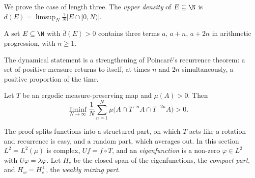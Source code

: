 We prove the case of length three. The \emph{upper density} of $E\subseteq\N$ is $\bar d(E)=\limsup_N\frac1N|E\cap[0,N)|$.

\begin{theorem}[Roth, 1953]\label{thm:roth}
A set $E\subseteq\N$ with $\bar d(E)>0$ contains three terms $a$, $a+n$, $a+2n$ in arithmetic progression, with $n\ge1$.
\end{theorem}

The dynamical statement is a strengthening of Poincar\'e's recurrence theorem: a set of positive measure returns to itself, at times $n$ and $2n$ simultaneously, a positive proportion of the time.

\begin{theorem}\label{thm:double}
Let $T$ be an ergodic measure-preserving map and $\mu(A)>0$. Then
\[
\liminf_{N\to\infty}\frac1N\sum_{n=1}^N\mu\bigl(A\cap T^{-n}A\cap T^{-2n}A\bigr)>0.
\]
\end{theorem}

The proof splits functions into a structured part, on which $T$ acts like a rotation and recurrence is easy, and a random part, which averages out. In this section $L^2=L^2(\mu)$ is complex,
$Uf=f\circ T$, and an \emph{eigenfunction} is a non-zero $\varphi\in L^2$ with $U\varphi=\lambda\varphi$. Let $H_c$ be the closed span of the eigenfunctions, the \emph{compact part}, and $H_w=H_c^\perp$, the
\emph{weakly mixing part}.


